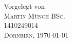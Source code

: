 \begin{titlepage}
\begin{center}
\begin{minipage}{0.48\textwidth}
\begin{center}
\end{center}
\end{minipage}
\hfill

\vspace*{\fill}

Vorgelegt von\\ [0.4cm]
\textsc{\Large Martin Münch BSc.}\\
1410249014 \\[2cm]

\textsc{ \large Dornbirn, \today}
\vfill %

\end{center}

\end{titlepage}


